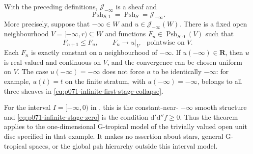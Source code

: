 \begin{theorem}
\label{thm:p071-cld-infinite-collar-endpoint}
With the preceding definitions, \(\mathscr J_{-\infty}\) is a sheaf and
\begin{equation}
 \operatorname{Psh}_{S,1}
   =\operatorname{Psh}_S
   =\mathscr J_{-\infty}.
 \label{eq:p071-infinite-first-stage-collapse}
\end{equation}
More precisely, suppose that \(-\infty\in W\) and
\(u\in\mathscr J_{-\infty}(W)\).  There is a fixed open neighbourhood
\(V=[-\infty,r)\subseteq W\) and functions
\(F_n\in\operatorname{Psh}_{S,0}(V)\) such that
\begin{equation}
 F_{n+1}\leq F_n,
 \qquad F_n\longrightarrow u|_V
 \quad\text{pointwise on }V.
 \label{eq:p071-infinite-fixed-domain-approximation}
\end{equation}
Each \(F_n\) is exactly constant on a neighbourhood of \(-\infty\).
If \(u(-\infty)\in\mathbf R\), then \(u\) is real-valued and continuous
on \(V\), and the convergence can be chosen uniform on \(V\).  The case
\(u(-\infty)=-\infty\) does not force \(u\) to be identically
\(-\infty\): for example, \(u(t)=t\) on the finite stratum, with
\(u(-\infty)=-\infty\), belongs to all three sheaves in
\eqref{eq:p071-infinite-first-stage-collapse}.

For the interval \(I=[-\infty,0)\) in
\cite[Example~6.7.2]{CLD25}, this is the constant-near-
\(-\infty\) smooth structure and
\eqref{eq:p071-infinite-stage-zero} is the condition
\(\mathrm d'\mathrm d''f\geq0\).  Thus the theorem applies to the
one-dimensional G-tropical model of the trivially valued open unit disc
specified in that example.  It makes no assertion about stars, general
G-tropical spaces, or the global psh hierarchy outside this interval
model.
\end{theorem}
